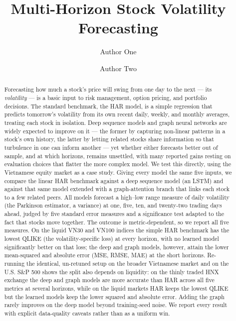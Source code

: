 \documentclass[runningheads]{llncs}
\begin{document}
\title{Multi-Horizon Stock Volatility Forecasting}

\author{Author One \and Author Two}

\maketitle

\begin{abstract}
Forecasting how much a stock's price will swing from one day to the next --- its \emph{volatility} --- is a
basic input to risk management, option pricing, and portfolio decisions. The standard benchmark, the HAR model,
is a simple regression that predicts tomorrow's volatility from its own recent daily, weekly, and monthly
averages, treating each stock in isolation. Deep sequence models and graph neural networks are widely expected
to improve on it --- the former by capturing non-linear patterns in a stock's own history, the latter by letting
related stocks share information so that turbulence in one can inform another --- yet whether either forecasts
better out of sample, and at which horizons, remains unsettled, with many reported gains resting on evaluation
choices that flatter the more complex model.
We test this directly, using the Vietnamese equity market as a case study. Giving every model the same five
inputs, we compare the linear HAR benchmark against a deep sequence model (an LSTM) and against that same model
extended with a graph-attention branch that links each stock to a few related peers. All models forecast a
high--low range measure of daily volatility (the Parkinson estimator, a variance) at one, five, ten, and
twenty-two trading days ahead, judged by five standard error measures and a significance test adapted to the
fact that stocks move together. The outcome is metric-dependent, so we report all five measures. On the liquid VN30 and VN100 indices the
simple HAR benchmark has the lowest QLIKE (the volatility-specific loss) at every horizon, with no learned
model significantly better on that loss; the deep and graph models, however, attain the lower mean-squared and
absolute error (MSE, RMSE, MAE) at the short horizons. Re-running the identical, un-retuned setup on the
broader Vietnamese market and on the U.S. S\&P 500 shows the split also depends on liquidity: on the thinly
traded HNX exchange the deep and graph models are more accurate than HAR across all five metrics at several
horizons, while on the liquid markets HAR keeps the lowest QLIKE but the learned models keep the lower squared
and absolute error. Adding the graph rarely improves on the deep model beyond training-seed noise. We report every result with explicit data-quality caveats rather than as a uniform win.
\end{abstract}
\end{document}
